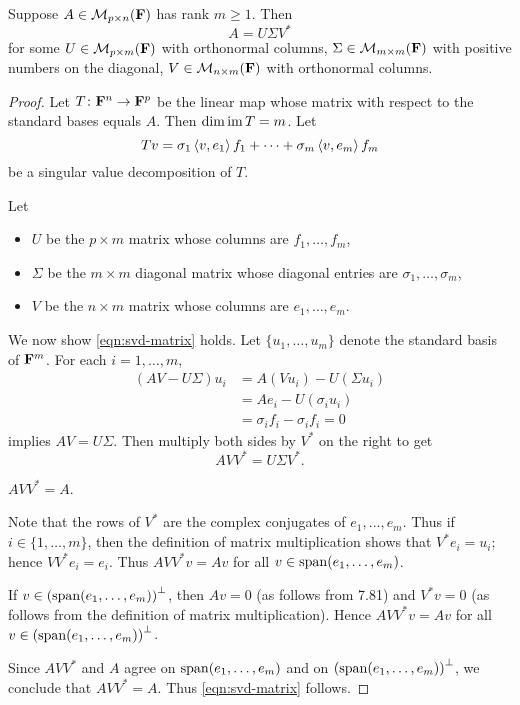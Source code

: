 \begin{theorem}
Suppose $A\in\mathcal{M}_{p\times n}(\mathbf F)$ has rank $m\ge1$. Then
\begin{equation}\label{eqn:svd-matrix}
A=U\Sigma V^*
\end{equation}
for some $U\in\mathcal{M}_{p\times m}(\mathbf F)$ with orthonormal columns, $\Sigma\in\mathcal{M}_{m\times m}(\mathbf F)$ with positive numbers on the diagonal, $V\in\mathcal{M}_{n\times m}(\mathbf F)$ with orthonormal columns. 
\end{theorem}

\begin{proof}
Let $T\colon\mathbf F^n\to\mathbf F^p$ be the linear map whose matrix with respect to the standard bases equals $A$. Then $\dim\operatorname{im} T=m$. Let
\[Tv=\sigma_1\left\langle v,e_1\right\rangle f_1+\cdots+\sigma_m\left\langle v,e_m\right\rangle f_m\]
be a singular value decomposition of $T$.

\begin{claim}
Let
\begin{itemize}
\item $U$ be the $p\times m$ matrix whose columns are $f_1,\dots,f_m$,
\item $\Sigma$ be the $m\times m$ diagonal matrix whose diagonal entries are $\sigma_1,\dots,\sigma_m$,
\item $V$ be the $n\times m$ matrix whose columns are $e_1,\dots,e_m$.
\end{itemize}
\end{claim}

We now show \eqref{eqn:svd-matrix} holds. 
Let $\{u_1,\dots,u_m\}$ denote the standard basis of $\mathbf F^m$. For each $i=1,\dots,m$,
\begin{align*}
(AV-U\Sigma)u_i
&=A(Vu_i)-U(\Sigma u_i)\\
&=Ae_i-U(\sigma_i u_i)\\
&=\sigma_if_i-\sigma_if_i=0
\end{align*}
implies $AV=U\Sigma$. 
Then multiply both sides by $V^*$ on the right to get
\[AVV^*=U\Sigma V^*.\]
\begin{claim}
$AVV^*=A$.
\end{claim}
Note that the rows of $V^*$ are the complex conjugates of $e_1,\dots,e_m$. 
Thus if $i\in\{1,\dots,m\}$, then the definition of matrix multiplication shows that $V^*e_i=u_i$; hence $VV^*e_i=e_i$. Thus $AVV^*v=Av$ for all $v\in\operatorname{span}(e_1,\dots,e_m)$.

If $v\in\left(\operatorname{span}(e_1,\dots,e_m)\right)^\perp$, then $Av=0$ (as follows from 7.81) and $V^*v=0$ (as follows from the definition of matrix multiplication). Hence $AVV^*v=Av$ for all $v\in\left(\operatorname{span}(e_1,\dots,e_m)\right)^\perp$.

Since $AVV^*$ and $A$ agree on $\operatorname{span}(e_1,\dots,e_m)$ and on $\left(\operatorname{span}(e_1,\dots,e_m)\right)^\perp$, we conclude that $AVV^*=A$. Thus \eqref{eqn:svd-matrix} follows.
\end{proof}
\pagebreak

